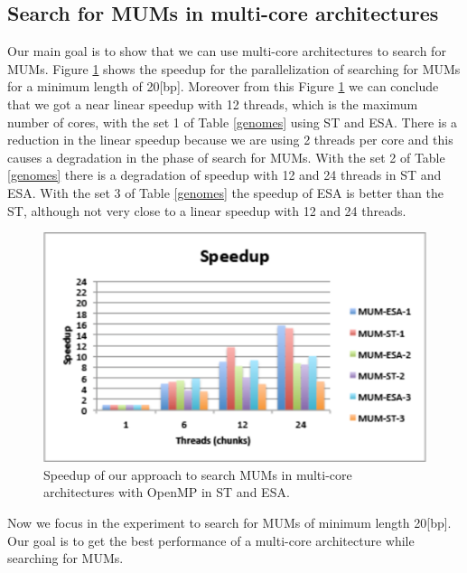 \documentclass{acm_proc_article-sp}
\begin{document}
 \subsection{Search for MUMs in multi-core architectures}
Our main goal is to show that we can use multi-core architectures to search for MUMs. Figure \ref{fig:speedup} shows the speedup for the parallelization of searching for MUMs for a minimum length of 20[bp]. Moreover from this Figure \ref{fig:speedup} we can conclude that we got a near linear speedup with 12 threads, which is the maximum number of cores, with the set 1 of Table \ref{genomes} using ST and ESA.  There is a reduction in the linear speedup because we are using 2 threads per core and this causes a degradation in the phase of search for MUMs. With the set 2 of Table \ref{genomes} there is a degradation of speedup with 12 and 24 threads in ST and ESA. With the set 3 of Table \ref{genomes} the speedup of ESA is better than the ST, although not very close to a linear speedup with 12 and 24 threads.
\begin{figure}[h]
  \centering
   \includegraphics[scale=0.65]{speedup-MUM.eps}
  \caption{Speedup of our approach to search MUMs in multi-core architectures with OpenMP in ST and ESA.}
  \label{fig:speedup}
\end{figure}  
Now we focus in the experiment to search for MUMs of minimum length 20[bp]. Our goal is to get the best performance of a multi-core architecture while searching for MUMs.
\end{document}
